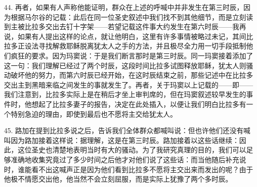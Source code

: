 44. 再者，如果有人声称他能证明，群众在上述的呼喊中并非发生在第三时辰，因为根据马尔谷的记载：此后在同一位圣史叙述中我们找不到其他细节，而是立刻读到主被比拉多交出去钉十字架——若望记载这件事大约发生在第六时辰——我再说，如果有人提出这样的论点，就让他明白，这里有许多事情被略过未记，其间比拉多正设法寻找解救耶稣脱离犹太人之手的方法，并且极尽全力用一切手段抵制他们疯狂的要求。因为玛窦说：于是我们断言那时是第三时辰。同一玛窦接着添加了这一句：我们理解已经过了两个时辰，这段时间比拉多试图释放耶稣，犹太人则骚动破坏他的努力，而第六时辰已经开始，在这时辰结束之前，那些记述中在比拉多交出主到黑暗来临之间发生的事就发生了。再者，关于玛窦以上记载的——即——我们注意到，比拉多实际上是在稍后才坐上审判席的，但在玛窦叙述较早发生的事件时，他想起了比拉多妻子的报告，决定在此处插入，以便让我们明白比拉多有一个特别急迫的理由，即使到最后也不愿将主交给犹太人。\par

45. 路加在提到比拉多说之后，告诉我们全体群众都喊叫说：但也许他们还没有喊叫因为路加接着这样说：据理解，这是在第三时辰。路加接着以这些话继续：因此，这位圣史也清楚地表明当时有大的骚动。为了我研究真理的目的，我们可以足够准确地收集究竟过了多少时间之后他才对他们说了这些话：而当他随后补充说时，谁能看不出这喊声正是因为他们看到比拉多不愿将主交出来而发出的呢？由于他极不情愿交出他，他当然不会立刻屈服，而是实际上犹豫了两个多时辰。\par

